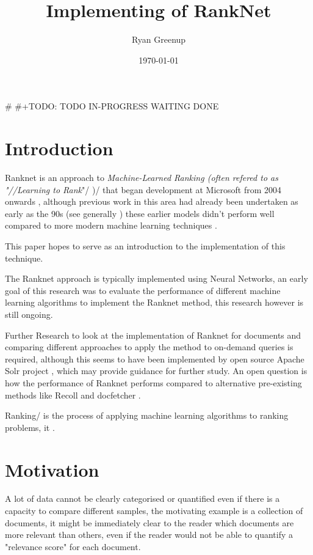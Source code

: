 \documentclass[a4paper,11pt,twoside]{article}
\author{Ryan Greenup}
\date{\today}
\title{Implementing of RankNet}
\begin{document}
\maketitle
\tableofcontents

\# \#+TODO: TODO IN-PROGRESS WAITING DONE
 \newpage 

\section{Introduction}
\label{sec:org67581ea}
Ranknet is an approach to \emph{Machine-Learned Ranking (often refered to
as "//Learning to Rank}"/ \cite{liuLearningRankInformation2009})/ that
began development at Microsoft from 2004 onwards
\cite{christopherburgesRankNetRankingRetrospective2015}, although
previous work in this area had already been undertaken as early as
the 90s (see generally
\cite{fuhrProbabilisticModelsInformation1992,fuhrOptimumPolynomialRetrieval1989,fuhrProbabilisticModelsInformation1992,geyInferringProbabilityRelevance1994,wongLinearStructureInformation1988})
these earlier models didn't perform well compared to more modern
machine learning techniques
\cite[\S 15.5]{manningIntroductionInformationRetrieval2008}.

This paper hopes to serve as an introduction to the implementation
of this technique.

The Ranknet approach is typically implemented using Neural Networks,
an early goal of this research was to evaluate the performance of
different machine learning algorithms to implement the Ranknet
method, this research however is still ongoing.

Further Research to look at the implementation of Ranknet for
documents and comparing different approaches to apply the method to
on-demand queries is required, although this seems to have been
implemented by open source Apache Solr project
\cite{michaelalcornIntroductionMachinelearnedRanking}, which may
provide guidance for further study. An open question is how the
performance of Ranknet performs compared to alternative pre-existing
methods like Recoll \cite{jean-francoisdockesRecollUserManual} and
docfetcher \cite{docfetcherdevelopmentteamDocFetcherFastDocument}.


Ranking/ is the process of applying machine learning algorithms to
ranking problems, it .
\section{Motivation}
\label{sec:org126824b}
A lot of data cannot be clearly categorised or quantified even if there
is a capacity to compare different samples, the motivating example
is a collection of documents, it might be immediately clear to the
reader which documents are more relevant than others, even if the
reader would not be able to quantify a "relevance score" for each
document.
\end{document}
